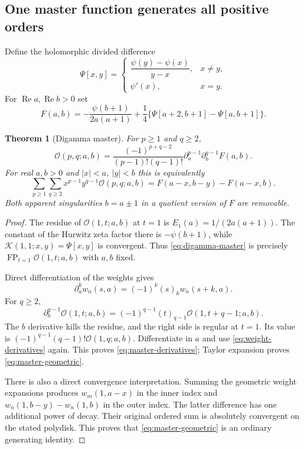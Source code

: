\documentclass[11pt,a4paper]{article}
\numberwithin{equation}{section}
\newtheorem{theorem}{Theorem}[section]
\theoremstyle{definition}
\theoremstyle{remark}
\DeclareMathOperator{\FP}{FP}
\newcommand{\Rea}{\operatorname{Re}}
\newcommand{\Ord}{\mathcal O}
\newcommand{\Kern}{\mathcal K}
\begin{document}
\subsection{One master function generates all positive orders}

Define the holomorphic divided difference
\[
 \Psi[x,y]=\begin{cases}
 \dfrac{\psi(y)-\psi(x)}{y-x},&x\ne y,\\[5pt]
 \psi'(x),&x=y.
 \end{cases}
\]
For $\Rea a,\Rea b>0$ set
\begin{equation}\label{eq:digamma-master}
 F(a,b)=-\frac{\psi(b+1)}{2a(a+1)}
 +\frac14\{\Psi[a+2,b+1]-\Psi[a,b+1]\}.
\end{equation}

\begin{theorem}[Digamma master]\label{thm:digamma-master}
For $p\ge1$ and $q\ge2$,
\begin{equation}\label{eq:master-derivatives}
 \Ord(p,q;a,b)=
 \frac{(-1)^{p+q-2}}{(p-1)!(q-1)!}
 \partial_a^{p-1}\partial_b^{q-1}F(a,b).
\end{equation}
For real $a,b>0$ and $|x|<a$, $|y|<b$ this is equivalently
\begin{equation}\label{eq:master-geometric}
 \sum_{p\ge1}\sum_{q\ge2}x^{p-1}y^{q-1}\Ord(p,q;a,b)
 =F(a-x,b-y)-F(a-x,b).
\end{equation}
Both apparent singularities $b=a\pm1$ in a quotient version of $F$
are removable.
\end{theorem}

\begin{proof}
The residue of $\Ord(1,t;a,b)$ at $t=1$ is
$E_1(a)=1/(2a(a+1))$. The constant of the Hurwitz zeta factor there is
$-\psi(b+1)$, while $\Kern(1,1;x,y)=\Psi[x,y]$ is convergent.
Thus \eqref{eq:digamma-master} is precisely
$\FP_{t=1}\Ord(1,t;a,b)$ with $a,b$ fixed.

Direct differentiation of the weights gives
\begin{equation}\label{eq:weight-derivatives}
 \partial_a^k w_n(s,a)=(-1)^k(s)_k w_n(s+k,a).
\end{equation}
For $q\ge2$,
\[
 \partial_b^{q-1}\Ord(1,t;a,b)
 =(-1)^{q-1}(t)_{q-1}\Ord(1,t+q-1;a,b).
\]
The $b$ derivative kills the residue, and the right side is regular at
$t=1$. Its value is $(-1)^{q-1}(q-1)!\Ord(1,q;a,b)$.
Differentiate in $a$ and use \eqref{eq:weight-derivatives} again.
This proves \eqref{eq:master-derivatives}; Taylor expansion proves
\eqref{eq:master-geometric}.

There is also a direct convergence interpretation. Summing the
geometric weight expansions produces $w_m(1,a-x)$ in the inner
index and $w_n(1,b-y)-w_n(1,b)$ in the outer index. The latter
difference has one additional power of decay. Their original ordered
sum is absolutely convergent on the stated polydisk. This proves that
\eqref{eq:master-geometric} is an ordinary generating identity.
\end{proof}
\end{document}
